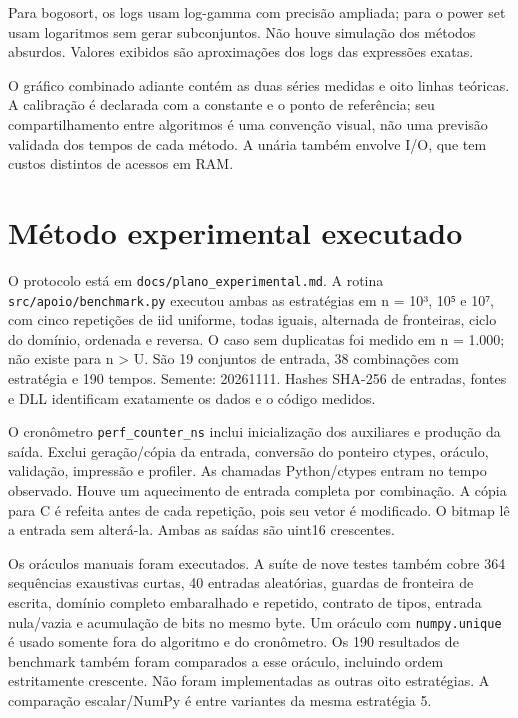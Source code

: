 \documentclass[
  brazilian,
  11pt,
  a4paper,
]{article}
\let\oldsection\section
\renewcommand{\section}{\Needspace{6\baselineskip}\oldsection}
\begin{document}
Para bogosort, os logs usam log-gamma com precisão ampliada; para o
power set usam logaritmos sem gerar subconjuntos. Não houve simulação
dos métodos absurdos. Valores exibidos são aproximações dos logs das
expressões exatas.

O gráfico combinado adiante contém as duas séries medidas e oito linhas
teóricas. A calibração é declarada com a constante e o ponto de
referência; seu compartilhamento entre algoritmos é uma convenção
visual, não uma previsão validada dos tempos de cada método. A unária
também envolve I/O, que tem custos distintos de acessos em RAM.

\section{Método experimental
executado}\label{muxe9todo-experimental-executado}

O protocolo está em
\texttt{docs/\allowbreak{}plano\_\allowbreak{}experimental.\allowbreak{}md}.
A rotina
\texttt{src/\allowbreak{}apoio/\allowbreak{}benchmark.\allowbreak{}py}
executou ambas as estratégias em n = 10³, 10⁵ e 10⁷, com cinco
repetições de iid uniforme, todas iguais, alternada de fronteiras, ciclo
do domínio, ordenada e reversa. O caso sem duplicatas foi medido em n =
1.000; não existe para n \textgreater{} U. São 19 conjuntos de entrada,
38 combinações com estratégia e 190 tempos. Semente: 20261111. Hashes
SHA-256 de entradas, fontes e DLL identificam exatamente os dados e o
código medidos.

O cronômetro \texttt{perf\_\allowbreak{}counter\_\allowbreak{}ns} inclui
inicialização dos auxiliares e produção da saída. Exclui geração/cópia
da entrada, conversão do ponteiro ctypes, oráculo, validação, impressão
e profiler. As chamadas Python/ctypes entram no tempo observado. Houve
um aquecimento de entrada completa por combinação. A cópia para C é
refeita antes de cada repetição, pois seu vetor é modificado. O bitmap
lê a entrada sem alterá-la. Ambas as saídas são uint16 crescentes.

Os oráculos manuais foram executados. A suíte de nove testes também
cobre 364 sequências exaustivas curtas, 40 entradas aleatórias, guardas
de fronteira de escrita, domínio completo embaralhado e repetido,
contrato de tipos, entrada nula/vazia e acumulação de bits no mesmo
byte. Um oráculo com \texttt{numpy.\allowbreak{}unique} é usado somente
fora do algoritmo e do cronômetro. Os 190 resultados de benchmark também
foram comparados a esse oráculo, incluindo ordem estritamente crescente.
Não foram implementadas as outras oito estratégias. A comparação
escalar/NumPy é entre variantes da mesma estratégia 5.
\end{document}
